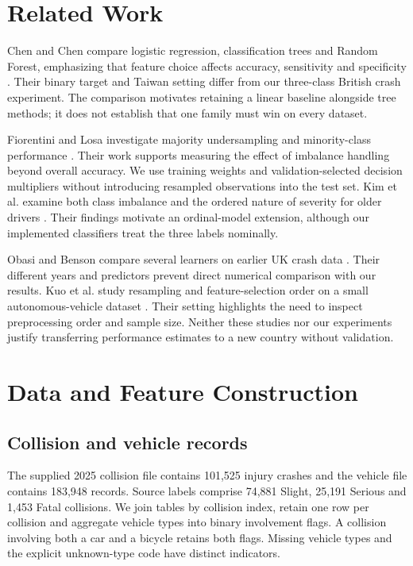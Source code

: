 \documentclass[conference]{IEEEtran}
\begin{document}
\section{Related Work}
Chen and Chen compare logistic regression, classification trees and Random Forest, emphasizing that feature choice affects accuracy, sensitivity and specificity \cite{chen}. Their binary target and Taiwan setting differ from our three-class British crash experiment. The comparison motivates retaining a linear baseline alongside tree methods; it does not establish that one family must win on every dataset.

Fiorentini and Losa investigate majority undersampling and minority-class performance \cite{fiorentini}. Their work supports measuring the effect of imbalance handling beyond overall accuracy. We use training weights and validation-selected decision multipliers without introducing resampled observations into the test set. Kim et al. examine both class imbalance and the ordered nature of severity for older drivers \cite{kim}. Their findings motivate an ordinal-model extension, although our implemented classifiers treat the three labels nominally.

Obasi and Benson compare several learners on earlier UK crash data \cite{obasi}. Their different years and predictors prevent direct numerical comparison with our results. Kuo et al. study resampling and feature-selection order on a small autonomous-vehicle dataset \cite{kuo}. Their setting highlights the need to inspect preprocessing order and sample size. Neither these studies nor our experiments justify transferring performance estimates to a new country without validation.

\section{Data and Feature Construction}
\subsection{Collision and vehicle records}
The supplied 2025 collision file contains 101,525 injury crashes and the vehicle file contains 183,948 records. Source labels comprise 74,881 Slight, 25,191 Serious and 1,453 Fatal collisions. We join tables by collision index, retain one row per collision and aggregate vehicle types into binary involvement flags. A collision involving both a car and a bicycle retains both flags. Missing vehicle types and the explicit unknown-type code have distinct indicators.
\end{document}
